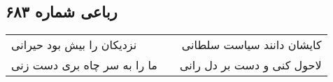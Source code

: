 \begin{center}
\section*{رباعی شماره ۶۸۳}
\label{sec:sh683}
\begin{longtable}{l p{0.5cm} r}
نزدیکان را بیش بود حیرانی
&&
کایشان دانند سیاست سلطانی
\\
ما را به سر چاه بری دست زنی
&&
لاحول کنی و دست بر دل رانی
\\
\end{longtable}
\end{center}
